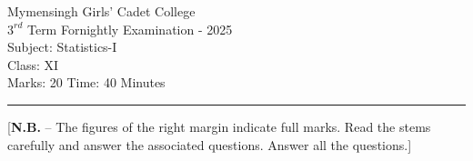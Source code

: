 \documentclass[12pt]{article}
\begin{document}
\begin{center}
Mymensingh Girls' Cadet College \\
$3^{rd}$ Term Fornightly Examination - 2025 \\
Subject: Statistics-I \\
Class: XI \\
Marks: 20 \hfill Time: 40 Minutes
\end{center}



\hrule


\begin{center}
[\textbf{N.B.} – The figures of the right margin indicate full marks. Read 
the stems carefully and answer the associated questions. Answer all the questions.]\\
\end{center}

\end{document}
